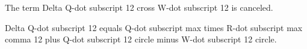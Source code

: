 The term Delta Q-dot subscript 12 cross W-dot subscript 12 is canceled.

Delta Q-dot subscript 12 equals Q-dot subscript max times R-dot subscript max comma 12 plus Q-dot subscript 12 circle minus W-dot subscript 12 circle.